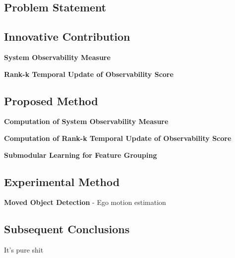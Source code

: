 \documentclass[10pt,twocolumn,letterpaper]{article}
\begin{document}
\subsection{Problem Statement}

\subsection{Innovative Contribution}

\textbf{System Observability Measure}

\textbf{Rank-k Temporal Update of Observability Score}

\subsection{Proposed Method}

\textbf{Computation of System Observability Measure}

\textbf{Computation of Rank-k Temporal Update of Observability Score}

\textbf{Submodular Learning for Feature Grouping}


\subsection{Experimental Method}

\textbf{Moved Object Detection} - Ego motion estimation

\subsection{Subsequent Conclusions}

It's pure shit
\end{document}
